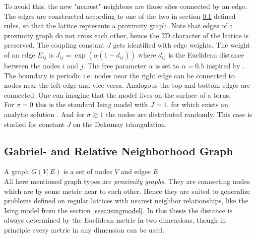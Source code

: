     To avoid this, the new "nearest" neighbors are those sites connected
    by an edge. The edges are constructed according to
    one of the two in section \ref{ssec:graphtypes} defined rules,
    so that the lattice represents a proximity graph. Note that edges
    of a proximity graph do not cross each other, hence the 2D character
    of the lattice is preserved. The coupling constant \(J\) gets
    identified with edge weights. The weight of an edge \(E_{ij}\) is
    \(J_{ij} = \exp (\alpha (1-d_{ij}))\) where \(d_{ij}\) is the Euclidean
    distance between the nodes \(i\) and \(j\). The free parameter
    \(\alpha\) is set to \(\alpha = 0.5\) inspired by \cite{Lima2000}.
    The boundary is periodic i.e. nodes near the right edge can be
    connected to nodes near the left edge and vice versa. Analogous the
    top and bottom edges are connected. One can imagine that the model
    lives on the surface of a torus.\\
    For \(\sigma = 0\) this is the standard Ising model with \(J = 1\),
    for which exists an analytic solution \cite{Onsager1944}. And for
    \(\sigma \gtrsim 1\) the nodes are distributed randomly. This case
    is studied for constant \(J\) on the Delaunay triangulation\cite{Janke1994}.\\

\subsection{Gabriel- and Relative Neighborhood Graph}
\label{ssec:graphtypes}
    A graph \(G(V,E)\) is a set of nodes \(V\) and edges \(E\).\\
    All here mentioned graph types are \emph{proximity graphs}. They are
    connecting nodes which are by some metric near to each other.
    Hence they are suited to generalize problems defined on regular
    lattices with nearest neighbor relationships, like the Ising model
    from the section \ref{ssec:isingmodel}.
    In this thesis the distance is always determined by the Euclidean
    metric in two dimensions, though in principle every metric in any
    dimension can be used.\\

